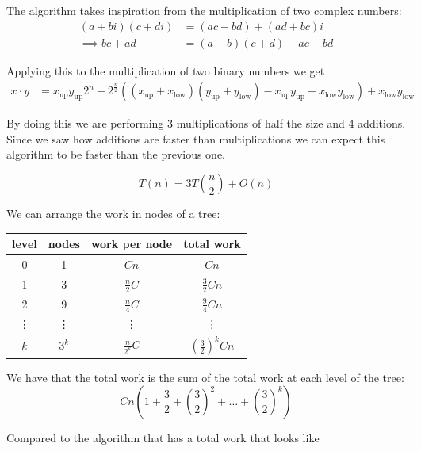 \documentclass[10pt]{extarticle}
\begin{document}
The algorithm takes inspiration from the multiplication of two complex numbers:
\begin{align*}
    (a + bi)(c + di) & = (ac - bd) + (ad + bc)i   \\
    \implies bc + ad & = (a + b)(c + d) - ac - bd
\end{align*}

Applying this to the multiplication of two binary numbers we get
\begin{align*}
    x \cdot y & = x_{\text{up}} y_{\text{up}} 2^n
    + 2^\frac{n}{2}((x_{\text{up}} + x_{\text{low}})(y_{\text{up}} + y_{\text{low}}) - x_{\text{up}}y_{\text{up}} - x_{\text{low}}y_{\text{low}}) + x_{\text{low}}y_{\text{low}}
\end{align*}

By doing this we are performing 3 multiplications of half the size and 4 additions.
Since we saw how additions are faster than multiplications we can expect this algorithm to be faster than the previous one.

$$
    T(n) = 3T\left(\frac{n}{2}\right) + O(n)
$$

We can arrange the work in nodes of a tree:

\begin{center}
    \begin{tabular}{ |c|c|c|c| }
        \hline
        level  & nodes  & work per node    & total work                      \\
        \hline
        0      & 1      & $Cn$             & $Cn$                            \\
        1      & 3      & $\frac{n}{2}C$   & $\frac{3}{2}Cn$                 \\
        2      & 9      & $\frac{n}{4}C$   & $\frac{9}{4}Cn$                 \\
        \vdots & \vdots & \vdots           & \vdots                          \\
        $k$    & $3^k$  & $\frac{n}{2^k}C$ & $\left(\frac{3}{2}\right)^k Cn$ \\
        \hline
    \end{tabular}
\end{center}

We have that the total work is the sum of the total work at each level of the tree:
$$
    Cn\left(1+\frac{3}{2}+\left(\frac{3}{2}\right)^2+\dots+\left(\frac{3}{2}\right)^k\right)
$$

Compared to the  algorithm that has a total work that looks like
\end{document}
